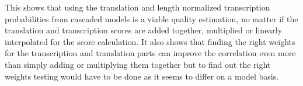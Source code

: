 This shows that using the translation and length normalized transcription probabilities from cascaded models is a viable quality estimation, no matter if the translation and transcription scores are added together, multiplied or linearly interpolated for the score calculation. It also shows that finding the right weights for the transcription and translation parts can improve the correlation even more than simply adding or multiplying them together but to find out the right weights testing would have to be done as it seems to differ on a model basis.



